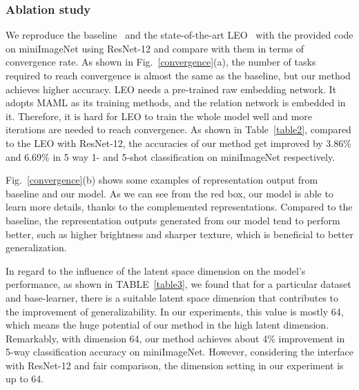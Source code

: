 \documentclass[10pt,conference,a4paper]{IEEEtran}
\begin{document}
\subsubsection{\textbf{Ablation study}}
We reproduce the baseline~\cite{lee2019meta} and the state-of-the-art LEO~\cite{rusu2019meta} with the provided code on miniImageNet using ResNet-12 and compare with them in terms of convergence rate. As shown in Fig.~\ref{convergence}(a), the number of tasks required to reach convergence is almost the same as the baseline, but our method achieves higher accuracy. LEO needs a pre-trained raw embedding network. It adopts MAML as its training methods, and the relation network is embedded in it. Therefore, it is hard for LEO to train the whole model well and more iterations are needed to reach convergence. As shown in Table~\ref{table2}, compared to the LEO with ResNet-12, the accuracies of our method get improved by 3.86\% and 6.69\% in 5 way 1- and 5-shot classification on miniImageNet respectively. 

Fig.~\ref{convergence}(b) shows some examples of representation output from baseline and our model. As we can see from the red box, our model is able to learn more details, thanks to the complemented representations. Compared to the baseline, the representation outputs generated from our model tend to perform better, such as higher brightness and sharper texture, which is beneficial to better generalization.

In regard to the influence of the latent space dimension on the model's performance, as shown in TABLE~\ref{table3}, we found that for a particular dataset and base-learner, there is a suitable latent space dimension that contributes to the improvement of generalizability. In our experiments, this value is mostly 64, which means the huge potential of our method in the high latent dimension. Remarkably, with dimension 64, our method achieves about 4\% improvement in 5-way classification accuracy on miniImageNet. However, considering the interface with ResNet-12 and fair comparison, the dimension setting in our experiment is up to 64.
\end{document}
